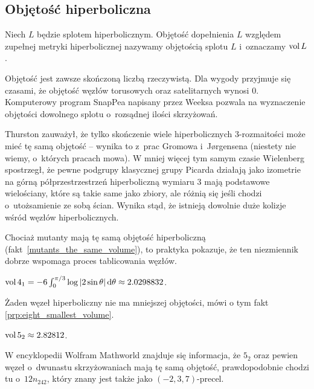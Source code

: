 
\subsection{Objętość hiperboliczna}

%
\begin{definition}[objętość]
    Niech $L$ będzie splotem hiperbolicznym.
    Objętość dopełnienia $L$ względem zupełnej metryki hiperbolicznej nazywamy objętością splotu $L$ i~oznaczamy $\operatorname{vol} L$.
\end{definition}

Objętość jest zawsze skończoną liczbą rzeczywistą.
Dla wygody przyjmuje się czasami, że objętość węzłów torusowych oraz satelitarnych wynosi $0$.
Komputerowy program SnapPea napisany przez Weeksa pozwala na wyznaczenie objętości dowolnego splotu o~rozsądnej ilości skrzyżowań.

Thurston \cite[s. 365]{thurston82} zauważył, że tylko skończenie wiele hiperbolicznych 3-rozmaitości może mieć tę samą objętość -- wynika to z~prac Gromowa i~Jørgensena (niestety nie wiemy, o~których pracach mowa).
%
W mniej więcej tym samym czasie Wielenberg \cite{wielenberg81} spostrzegł, że pewne podgrupy klasycznej grupy Picarda działają jako izometrie na górną półprzestrzestrzeń hiperboliczną wymiaru 3 mają podstawowe wielościany, które są takie same jako zbiory, ale różnią się jeśli chodzi o~utożsamienie ze sobą ścian.
%
%
Wynika stąd, że istnieją dowolnie duże kolizje wśród węzłów hiperbolicznych.

Chociaż mutanty mają tę samą objętość hiperboliczną (fakt~\ref{mutants_the_same_volume}), to praktyka pokazuje, że ten niezmiennik dobrze wspomaga proces tablicowania węzłów.
%

\begin{example}
    $\operatorname{vol} 4_1 = -6 \int_{0}^{\pi/3} \log |2\sin \theta| \,\mathrm{d}\theta \approx 2.0298832$.
\end{example}

Żaden węzeł hiperboliczny nie ma mniejszej objętości, mówi o tym fakt \ref{prp:eight_smallest_volume}.

\begin{example}
    $\operatorname{vol} 5_2 \approx 2.82812$.
\end{example}

W encyklopedii Wolfram Mathworld znajduje się informacja, że $5_2$ oraz pewien węzeł o~dwunastu skrzyżowaniach mają tę samą objętość, prawdopodobnie chodzi tu o~$12n_{242}$, który znany jest także jako $(-2, 3, 7)$-precel.
%
%


